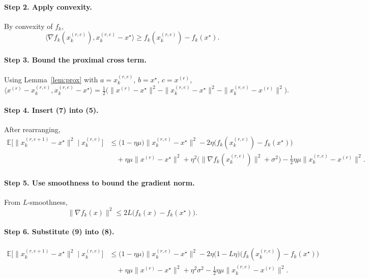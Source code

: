 \documentclass{article}
\newcommand{\E}{\mathbb{E}}
\begin{document}
\paragraph{Step 2. Apply convexity.}  
By convexity of $f_k$,
\[
\langle \nabla f_k(x_{k}^{(r,e)}),x_{k}^{(r,e)}-x^\star\rangle \ge f_k(x_{k}^{(r,e)})-f_k(x^\star).
\tag{6}
\]

\paragraph{Step 3. Bound the proximal cross term.}  
Using Lemma~\ref{lem:prox} with $a=x_{k}^{(r,e)}$, $b=x^\star$, $c=x^{(r)}$,
\[
\langle x^{(r)}-x_{k}^{(r,e)},x_{k}^{(r,e)}-x^\star\rangle
= \tfrac12\Big(\|x^{(r)}-x^\star\|^2-\|x_{k}^{(r,e)}-x^\star\|^2-\|x_{k}^{(r,e)}-x^{(r)}\|^2\Big).
\tag{7}
\]

\paragraph{Step 4. Insert (7) into (5).}  
After rearranging,
\[
\begin{aligned}
\E\big[\|x_{k}^{(r,e+1)}-x^\star\|^2\mid x_{k}^{(r,e)}\big]
&\le \big(1-\eta\mu\big)\|x_{k}^{(r,e)}-x^\star\|^2
-\!2\eta\big(f_k(x_{k}^{(r,e)})-f_k(x^\star)\big) \\
&\quad +\eta\mu\|x^{(r)}-x^\star\|^2
+\eta^2\big(\|\nabla f_k(x_{k}^{(r,e)})\|^2+\sigma^2\big)
-\tfrac12\eta\mu\|x_{k}^{(r,e)}-x^{(r)}\|^2 .
\end{aligned}
\tag{8}
\]

\paragraph{Step 5. Use smoothness to bound the gradient norm.}  
From $L$‑smoothness,
\[
\|\nabla f_k(x)\|^2 \le 2L\big(f_k(x)-f_k(x^\star)\big).
\tag{9}
\]

\paragraph{Step 6. Substitute (9) into (8).}  
\[
\begin{aligned}
\E\big[\|x_{k}^{(r,e+1)}-x^\star\|^2\mid x_{k}^{(r,e)}\big]
&\le \big(1-\eta\mu\big)\|x_{k}^{(r,e)}-x^\star\|^2
-\!2\eta\big(1-L\eta\big)\big(f_k(x_{k}^{(r,e)})-f_k(x^\star)\big) \\
&\quad +\eta\mu\|x^{(r)}-x^\star\|^2
+\eta^2\sigma^2
-\tfrac12\eta\mu\|x_{k}^{(r,e)}-x^{(r)}\|^2 .
\end{aligned}
\tag{10}
\]
\end{document}
